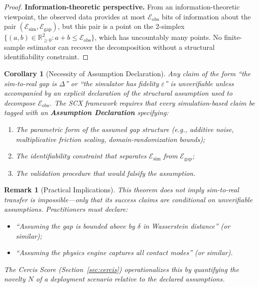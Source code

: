 \documentclass[11pt,twocolumn]{article}
\newtheorem{corollary}[theorem]{Corollary}
\newtheorem{remark}[theorem]{Remark}
\theoremstyle{definition}
\newcommand{\R}{\mathbb{R}}
\begin{document}
\begin{proof}
\medskip\noindent
\textbf{Information-theoretic perspective.}
From an information-theoretic viewpoint, the observed data provides at most
$\mathcal{E}_{\text{obs}}$ bits of information about the pair
$(\mathcal{E}_{\text{sim}}, \mathcal{E}_{\text{gap}})$, but this pair is a
point on the 2-simplex $\{ (a,b) \in \R_{\ge 0}^2 : a + b \le
\mathcal{E}_{\text{obs}} \}$, which has uncountably many points.  No
finite-sample estimator can recover the decomposition without a structural
identifiability constraint.
\end{proof}

\begin{corollary}[Necessity of Assumption Declaration]
\label{cor:assumption}
Any claim of the form ``the sim-to-real gap is $\Delta$'' or ``the simulator
has fidelity $\varepsilon$'' is \emph{unverifiable} unless accompanied by an
explicit declaration of the structural assumption used to decompose
$\mathcal{E}_{\text{obs}}$.  The SCX framework requires that every
simulation-based claim be tagged with an \textbf{Assumption Declaration}
specifying:
\begin{enumerate}[label=(\roman*),nosep]
  \item The parametric form of the assumed gap structure (e.g., additive noise,
    multiplicative friction scaling, domain-randomization bounds);
  \item The identifiability constraint that separates $\mathcal{E}_{\text{sim}}$
    from $\mathcal{E}_{\text{gap}}$;
  \item The validation procedure that would falsify the assumption.
\end{enumerate}
\end{corollary}

\begin{remark}[Practical Implications]
This theorem does \emph{not} imply sim-to-real transfer is impossible---only
that its success claims are conditional on unverifiable assumptions.
Practitioners \emph{must} declare:
\begin{itemize}[nosep]
  \item ``Assuming the gap is bounded above by $\delta$ in Wasserstein
    distance'' (or similar);
  \item ``Assuming the physics engine captures all contact modes'' (or similar).
\end{itemize}
The Cercis Score (Section~\ref{sec:cercis}) operationalizes this by
quantifying the \emph{novelty} $N$ of a deployment scenario relative to the
declared assumptions.
\end{remark}
\end{document}
